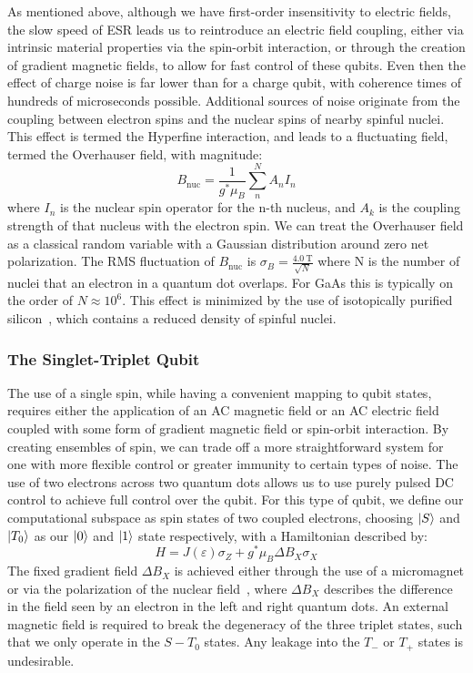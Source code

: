 As mentioned above, although we have first-order insensitivity to electric fields, the slow speed of ESR leads us to
reintroduce an electric field coupling, either via intrinsic material properties via the spin-orbit interaction, or through
the creation of gradient magnetic fields, to allow for fast control of these qubits. Even then the effect of charge noise
is far lower than for a charge qubit, with coherence times of hundreds of microseconds possible. Additional sources
of noise originate from the coupling between electron spins and the nuclear spins of nearby spinful nuclei. This
effect is termed the Hyperfine interaction, and leads to a fluctuating field, termed the Overhauser field, with magnitude:
\begin{equation}
  B_{\textrm{nuc}} = \frac{1}{g^* \mu_B} \sum^N_n A_nI_n
\end{equation}
where $I_n$ is the nuclear spin operator for the n-th nucleus, and $A_k$ is the coupling strength of that nucleus with the
electron spin. We can treat the Overhauser field as a classical random variable with a Gaussian distribution around zero net
polarization. The RMS fluctuation of $B_{\textrm{nuc}}$ is $\sigma_B = \tfrac{\SI{4.0}{\tesla}}{\sqrt{N}}$ where N is the number of
nuclei that an electron in a quantum dot overlaps\cite{PhysRevB.76.035315}. For GaAs this is typically on the order of $N \approx 10^6$.
This effect is minimized by the use of isotopically purified silicon~\cite{itoh_watanabe_2014}, which contains a
reduced density of spinful nuclei.

\subsubsection{The Singlet-Triplet Qubit}
The use of a single spin, while having a convenient mapping to qubit states, requires either the application of an AC magnetic field
or an AC electric field coupled with some form of gradient magnetic field or spin-orbit interaction. By creating ensembles of
spin, we can trade off a more straightforward system for one with more flexible control or greater immunity to certain types of noise.
The use of two electrons across two quantum dots allows us to use purely pulsed DC control to achieve full control
over the qubit. For this type of qubit, we define our computational subspace as spin states of two coupled electrons, choosing
$\ket{S}$ and $\ket{T_0}$ as our $\ket{0}$ and $\ket{1}$ state respectively, with a Hamiltonian described by:
\begin{equation}
  H = J(\varepsilon)\sigma_Z + g^* \mu_B \Delta B_X \sigma_X
\end{equation}
The fixed gradient field $\Delta B_X$ is achieved either through the use of a micromagnet or via the polarization of the nuclear
field~\cite{PhysRevLett.105.216803}, where $\Delta B_X$ describes the difference in the field seen by an electron in the left and
right quantum dots. An external magnetic field is required to break the degeneracy of the three triplet states, such that
we only operate in the $S-T_0$ states. Any leakage into the $T_-$ or $T_+$ states is undesirable.

